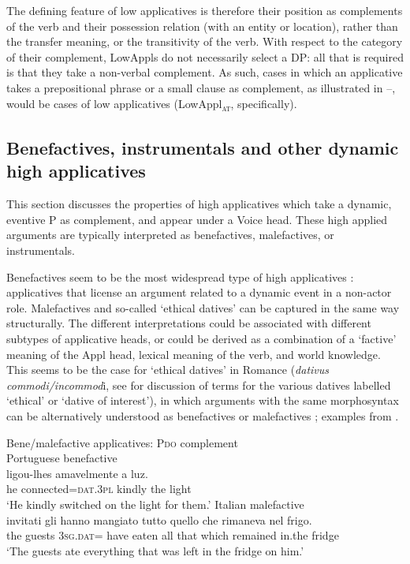 \documentclass[output=paper,colorlinks,citecolor=brown,nonflat]{./langscibook}
\begin{document}
The defining feature of low applicatives is therefore their position as complements of the verb and their possession relation (with an entity or location), rather than the transfer meaning, or the transitivity of the verb. With respect to the category of their complement, LowAppls do not necessarily select a DP: all that is required is that they take a non-verbal complement. As such, cases in which an applicative takes a prepositional phrase or a small clause as complement, as illustrated in --, would be cases of low applicatives (LowAppl\textsc{\textsubscript{at}}, specifically).

\subsection{Benefactives, instrumentals and other dynamic high applicatives}\label{sec:cuervo:4.2}

This section discusses the properties of high applicatives which take a dynamic, eventive \liv P as complement, and appear under a Voice head. These high applied arguments are typically interpreted as benefactives, malefactives, or instrumentals. 

Benefactives seem to be the most widespread type of high applicatives \citep{Polinsky2013}: applicatives that license an argument related to a dynamic event in a non-actor role. Malefactives and so-called ‘ethical datives’ can be captured in the same way structurally. The different interpretations could be associated with different subtypes of applicative heads, or could be derived as a combination of a ‘factive’ meaning of the Appl head, lexical meaning of the verb, and world knowledge. This seems to be the case for ‘ethical datives’ in Romance (\textit{dativus commodi/incommod}i, see \citealt{RobergeTroberg2009} for discussion of terms for the various datives labelled ‘ethical’ or ‘dative of interest’), in which arguments with the same morphosyntax can be alternatively understood as benefactives  or malefactives ; examples from \citealt{RobergeTroberg2009}.

\ea%
    \label{ex:cuervo:9}
    Bene/malefactive applicatives: \liv P\textsc{do} complement\\
    \ea%
        \label{ex:cuervo:9a}
        Portuguese benefactive\\
         {ligou-lhes}   {amavelmente} {a} {luz}.\\
        he   connected=\textsc{dat.3pl} kindly   the light\\
        \glt ‘He kindly switched on the light for them.’
    \ex%
        \label{ex:cuervo:9b}
        Italian malefactive\\
         {invitati} {gli} {hanno} {mangiato} {tutto} {quello} {che} {rimaneva} {nel} {frigo}.\\
         the guests 3\textsc{sg.dat}= have eaten all that which remained in.the fridge\\
        \glt ‘The guests ate everything that was left in the fridge on him.’
    \z
\z
\end{document}
